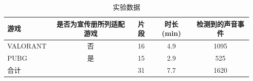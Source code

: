 \begin{table}[htbp]\centering
\caption{实验数据}\label{tab:b_data}
{\small\begin{threeparttable}
\begin{tabular}{lcccc}\toprule
游戏 & 是否为宣传册所列适配游戏 & 片段 & 时长 (min) & 检测到的声音事件 \\
\midrule
VALORANT & 否 & 16 & 4.9 & 1095 \\
PUBG & 是 & 15 & 2.9 & 525 \\
合计 &  & 31 & 7.7 & 1620 \\
\bottomrule\end{tabular}
\end{threeparttable}}
\end{table}
